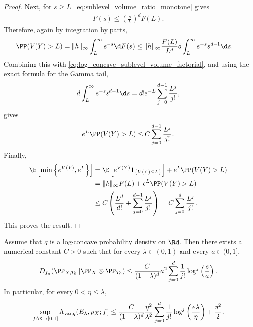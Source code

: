 \begin{proof}
    Next, for $s\ge L$, \eqref{eq:sublevel_volume_ratio_monotone} gives
    \begin{align}
        F(s)\le \left(\frac{s}{L}\right)^d F(L).
    \end{align}
    Therefore, again by integration by parts,
    \begin{align}
        \PP(V(Y)>L)
         & =
        \|h\|_\infty
        \int_L^\infty e^{-s}\d F(s)
        \le
        \|h\|_\infty
        \frac{F(L)}{L^d}
        d\int_L^\infty e^{-s}s^{d-1}\d s.
    \end{align}
    Combining this with \eqref{eq:log_concave_sublevel_volume_factorial},
    and using the exact formula for the Gamma tail,
    \begin{align}
        d\int_L^\infty e^{-s}s^{d-1}\d s
        =
        d!e^{-L}\sum_{j=0}^{d-1}\frac{L^j}{j!},
    \end{align}
    gives
    \begin{align}
        e^L\PP(V(Y)>L)
        \le
        C\sum_{j=0}^{d-1}\frac{L^j}{j!}.
        \label{eq:log_concave_potential_tail_factorial}
    \end{align}
    Finally,
    \begin{align}
        \E\left[
            \min\left\{e^{V(Y)},e^L\right\}
            \right]
         & =
        \E\left[
            e^{V(Y)}\mathbf{1}_{\{V(Y)\le L\}}
            \right]
        +
        e^L\PP(V(Y)>L)
        \\
         & =
        \|h\|_\infty F(L)
        +
        e^L\PP(V(Y)>L)
        \\
         & \le
        C
        \left(
        \frac{L^d}{d!}
        +
        \sum_{j=0}^{d-1}\frac{L^j}{j!}
        \right)
        =
        C
        \sum_{j=0}^d\frac{L^j}{j!}.
    \end{align}
    This proves the result.
\end{proof}


\begin{theorem}
    \label{theorem:log_concave_d_log_factor_factorial}
    Assume that $q$ is a log-concave probability density on $\Rd$.
    Then there exists a numerical constant $C>0$ such that for every
    $\lambda\in(0,1)$ and every $a\in(0,1]$,
    \begin{align}
        D_{f_a}(\PP_{X,T_0}\|\PP_X\otimes\PP_{T_0})
        \le
        \frac{C}{(1-\lambda)^d}
        a^2
        \sum_{j=0}^d
        \frac{1}{j!}
        \log^j\left(\frac{e}{a}\right).
        \label{eq:log_concave_d_log_factor_factorial_fa_upper}
    \end{align}
    In particular, for every $0<\eta\le \lambda$,
    \begin{align}
        \sup_{f:\K\to[0,1]}
        \Lambda_{\mathrm{var},q}(E_\lambda,p_X;f)
        \le
        \frac{C}{(1-\lambda)^d}
        \frac{\eta^2}{\lambda^2}
        \sum_{j=0}^d
        \frac{1}{j!}
        \log^j\left(\frac{e\lambda}{\eta}\right)
        +
        \frac{\eta^2}{2}.
        \label{eq:log_concave_d_log_factor_factorial_variance_upper}
    \end{align}
\end{theorem}

